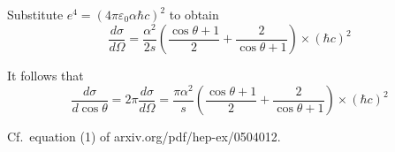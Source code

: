 Substitute $e^4=(4\pi\varepsilon_0\alpha\hbar c)^2$ to obtain
\begin{equation*}
\frac{d\sigma}{d\Omega}=\frac{\alpha^2}{2s}
\left(\frac{\cos\theta+1}{2}+\frac{2}{\cos\theta+1}\right)\times(\hbar c)^2
\end{equation*}

It follows that
\begin{equation*}
\frac{d\sigma}{d\cos\theta}=2\pi\frac{d\sigma}{d\Omega}
=\frac{\pi\alpha^2}{s}
\left(\frac{\cos\theta+1}{2}+\frac{2}{\cos\theta+1}\right)\times(\hbar c)^2
\end{equation*}

Cf.~equation (1) of arxiv.org/pdf/hep-ex/0504012.


